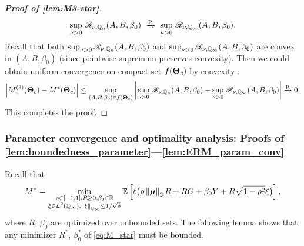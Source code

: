 \begin{proof}[\textbf{Proof of \cref{lem:M3-star}}]
    \begin{equation*}
        \sup_{\nu > 0} \,
        \mathscr{R}_{\nu, \mathbb{Q}_n}(A, B, \beta_0)
        \ \xrightarrow{\mathrm{p}} \
        \sup_{\nu > 0} \,
        \mathscr{R}_{\nu, \mathbb{Q}_\infty}(A, B, \beta_0).
    \end{equation*}
    Recall that both $\sup_{\nu > 0} \mathscr{R}_{\nu, \mathbb{Q}_n}(A, B, \beta_0)$ and $\sup_{\nu > 0} \mathscr{R}_{\nu, \mathbb{Q}_\infty}(A, B, \beta_0)$ are convex in $(A, B, \beta_0)$ (since pointwise supremum preserves convexity). Then we could obtain uniform convergence on compact set $f(\text{\boldmath $\Theta$}_{c})$ by convexity \cite[Lemma 7.75]{liese2008statistical}:
    \begin{equation*}
    \left|{M_n^{(3)}(\text{\boldmath $\Theta$}_{c}) - M^*(\text{\boldmath $\Theta$}_{c})}\right|
    \le
        \sup_{ (A, B, \beta_0) \in f(\text{\boldmath $\Theta$}_{c}) } \left|{
        \, \sup_{\nu > 0} \, \mathscr{R}_{\nu, \mathbb{Q}_n}(A, B, \beta_0)
        - \sup_{\nu > 0} \, \mathscr{R}_{\nu, \mathbb{Q}_\infty}(A, B, \beta_0)
        }\right| \xrightarrow{\mathrm{p}} 0.
    \end{equation*}
    This completes the proof.
\end{proof}






\subsubsection{Parameter convergence and optimality analysis: Proofs of \cref{lem:boundedness_parameter}---\ref{lem:ERM_param_conv}}
\label{append_subsubsec:ERM_param}

Recall that
\begin{equation}
    \label{eq:M_star}
    M^{*}
    = \min_{ \substack{ \rho \in [-1, 1], R \ge 0, \beta_0 \in \mathbb{R} \\ \xi \in \mathcal{L}^2(\mathbb{Q}_\infty), \left\|{\xi}\right\|_{\mathbb{Q}_\infty} \le 1/\sqrt{\delta} } } 
    \mathbb{E} \left[ \ell \bigl( \rho\left\|{{\boldsymbol{\mu}}}\right\|_2 R + RG + \beta_0 Y + R\sqrt{1 - \rho^2} \xi \bigr) \right],
\end{equation}
where $R$, $\beta_0$ are optimized over unbounded sets. The following lemma shows that any minimizer $R^*$, $\beta_0^*$ of \cref{eq:M_star} must be bounded.


